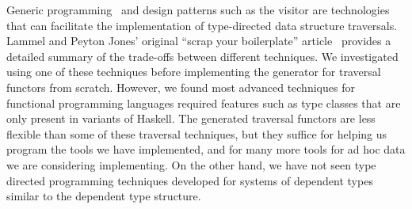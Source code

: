Generic
programming~\cite{jeuring+:polytypic-programming,hinze+:generic-programming,lammel+:syb}
and design patterns such as the visitor are technologies that can
facilitate the implementation of type-directed data structure
traversals.  Lammel and Peyton Jones' original ``scrap your
boilerplate'' article~\cite{lammel+:syb} provides a detailed summary
of the trade-offs between different techniques.  We investigated using
one of these techniques before implementing the generator for
\padsml{} traversal functors from scratch.  However, we found most
advanced techniques for functional programming languages required
features such as type classes that are only present in variants of
Haskell.  The generated \padsml{} traversal functors are less flexible
than some of these traversal techniques, but they suffice for helping
us program the tools we have implemented, and for many more tools for
ad hoc data we are considering implementing.  On the other hand, we
have not seen type directed programming techniques developed for
systems of dependent types similar to the \padsml{} dependent type
structure.  





  




